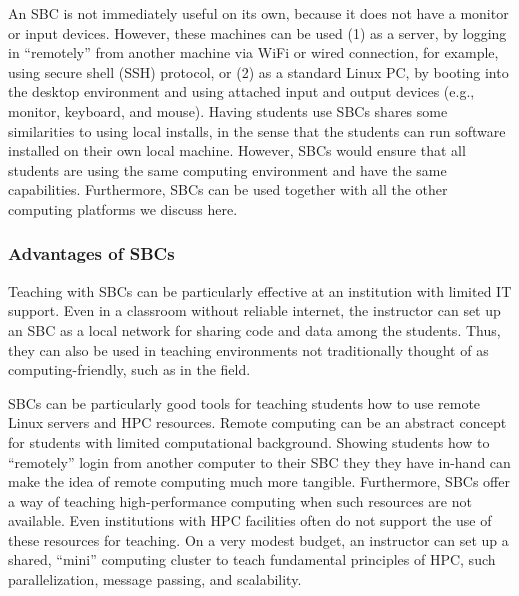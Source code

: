 An SBC is not immediately useful on its own, because it does not have a monitor
or input devices.
However, these machines can be used
(1) as a server, by logging in ``remotely'' from another machine via WiFi or
wired connection, for example, using secure shell (SSH) protocol,
or
(2) as a standard Linux PC, by booting into the desktop environment and using
attached input and output devices (e.g., monitor, keyboard, and mouse).
Having students use SBCs shares some similarities to using local
installs, in the sense that the students can run software installed on their
own local machine.
However, SBCs would ensure that all students are using the same
computing environment and have the same capabilities.
Furthermore, SBCs can be used together with all the other computing platforms we
discuss here.

\subsubsection{Advantages of SBCs}

Teaching with SBCs can be particularly effective at an institution with limited
IT support.
Even in a classroom without reliable internet, the instructor can set up an SBC
as a local network for sharing code and data among the students.
Thus, they can also be used in teaching environments not traditionally thought
of as computing-friendly, such as in the field.

SBCs can be particularly good tools for teaching students how
to use remote Linux servers and HPC resources.
Remote computing can be an abstract concept for students with limited
computational background.
Showing students how to ``remotely'' login from another computer to their SBC
they they have in-hand can make the idea of remote computing much more
tangible.
Furthermore, SBCs offer a way of teaching high-performance
computing when such resources are not available.
Even institutions with HPC facilities often do not support the use of these
resources for teaching.
On a very modest budget, an instructor can set up a shared, ``mini''
computing cluster to teach fundamental principles of HPC, such parallelization,
message passing, and scalability.

